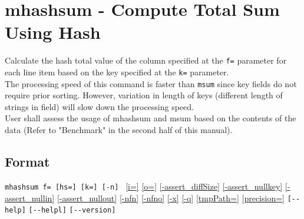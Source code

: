 
%

\section{mhashsum - Compute Total Sum Using Hash\label{sect:mhashsum}}
Calculate the hash total value of the column specified at the \verb|f=| parameter for each line item based on the key specified at the \verb|k=| parameter. \\
The processing speed of this command is faster than \verb|msum| since key fields do not require prior sorting. However, variation in length of keys (different length of strings in field) will slow down the processing speed. \\
User shall assess the usage of mhashsum and msum based on the contents of the data (Refer to "Benchmark" in the second half of this manual). \\

\subsection*{Format}
\verb|mhashsum f= [hs=] [k=] [-n] |
\hyperref[sect:option_i]{[i=]}
\hyperref[sect:option_o]{[o=]}
\hyperref[sect:option_assert_diffSize]{[-assert\_diffSize]}
\hyperref[sect:option_assert_nullkey]{[-assert\_nullkey]}
\hyperref[sect:option_assert_nullin]{[-assert\_nullin]}
\hyperref[sect:option_assert_nullout]{[-assert\_nullout]}
\hyperref[sect:option_nfn]{[-nfn]} 
\hyperref[sect:option_nfno]{[-nfno]}  
\hyperref[sect:option_x]{[-x]}
\hyperref[sect:option_q]{[-q]}
\hyperref[sect:option_option_tmppath]{[tmpPath=]}
\hyperref[sect:option_precision]{[precision=]}
\verb|[--help]|
\verb|[--helpl]|
\verb|[--version]|\\


